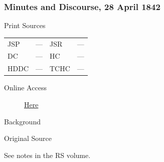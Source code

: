 		\subsubsection{Minutes and Discourse, 28 April 1842}
			\label{EMS-1842-JS-28-APR-1842}
			
			\begin{description}
				\item[Print Sources]
			\end{description}

			\begin{tabular}{p{0.5in}p{1in}p{0.5in}p{1in}}
				JSP	 	& ---		& JSR 		& --- \\
				DC	 	& ---		& HC 		& --- \\
				HDDC 	& ---		& TCHC 		& --- \\
			\end{tabular}
			
			\begin{description}
				\item[Online Access] \href{https://www.josephsmithpapers.org/paper-summary/minutes-and-discourse-28-april-1842/1}{Here}
			\end{description}
			
			\begin{description}
				\item[Background]
			\end{description}
			
			
			\begin{description}
				\item[Original Source]
			\end{description}
			
				See notes in the RS volume.
			
			
